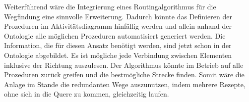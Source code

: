 Weiterführend wäre die Integrierung eines Routingalgorithmus für die Wegfindung eine sinnvolle Erweiterung. Dadurch könnte das Definieren der Prozeduren im Aktivitätsdiagramm hinfällig werden und allein anhand der Ontologie alle möglichen Prozeduren automatisiert generiert werden. Die Information, die für diesen Ansatz benötigt werden, sind jetzt schon in der Ontologie abgebildet. Es ist mögliche jede Verbindung zwischen Elementen inklusive der Richtung auszulesen. Der Algorithmus könnte im Betrieb auf alle Prozeduren zurück greifen und die bestmögliche Strecke finden.
Somit wäre die Anlage im Stande die redundanten Wege auszunutzen, indem mehrere Rezepte, ohne sich in die Quere zu kommen, gleichzeitig laufen.

